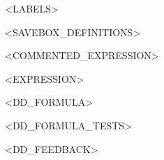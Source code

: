 \documentclass{article}
\begin{document}




<LABELS>

%
\newcommand\DDB[2]{\DDbox{#1}{<BOX_WIDTH>}{<BOX_HEIGHT>}{#2}}
\newcommand\DDBB[2]{\DDbox{#1}{10ex}{6ex}{#2}}
\newcommand\DDBBB[2]{\DDbox{#1}{12ex}{6ex}{#2}}
\newcommand\DDBBBB[2]{\DDbox{#1}{14ex}{6ex}{#2}}

<SAVEBOX_DEFINITIONS>


<COMMENTED_EXPRESSION>

<EXPRESSION>

<DD_FORMULA>

<DD_FORMULA_TESTS>

<DD_FEEDBACK>

\writeDDlabels[4.3ex]
\end{document}
